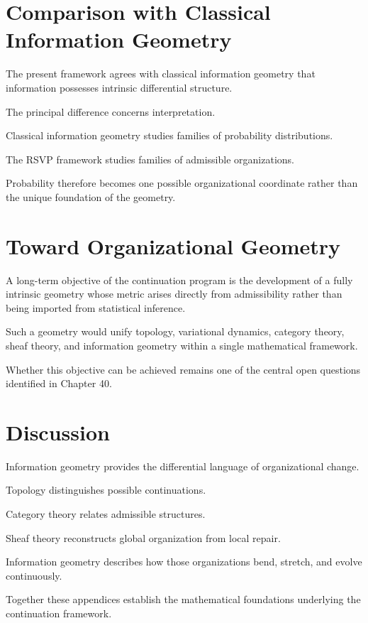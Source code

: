 \documentclass[11pt,oneside]{book}
\numberwithin{equation}{chapter}
\theoremstyle{definition}
\theoremstyle{plain}
\begin{document}
\section{Comparison with Classical Information Geometry}

The present framework agrees with classical information geometry that
information possesses intrinsic differential structure.

The principal difference concerns interpretation.

Classical information geometry studies families of probability
distributions.

The RSVP framework studies families of admissible organizations.

Probability therefore becomes one possible organizational coordinate
rather than the unique foundation of the geometry.

\section{Toward Organizational Geometry}

A long-term objective of the continuation program is the development of a
fully intrinsic geometry whose metric arises directly from admissibility
rather than being imported from statistical inference.

Such a geometry would unify topology, variational dynamics, category
theory, sheaf theory, and information geometry within a single
mathematical framework.

Whether this objective can be achieved remains one of the central open
questions identified in Chapter 40.

\section{Discussion}

Information geometry provides the differential language of organizational
change.

Topology distinguishes possible continuations.

Category theory relates admissible structures.

Sheaf theory reconstructs global organization from local repair.

Information geometry describes how those organizations bend, stretch,
and evolve continuously.

Together these appendices establish the mathematical foundations
underlying the continuation framework.
\end{document}
